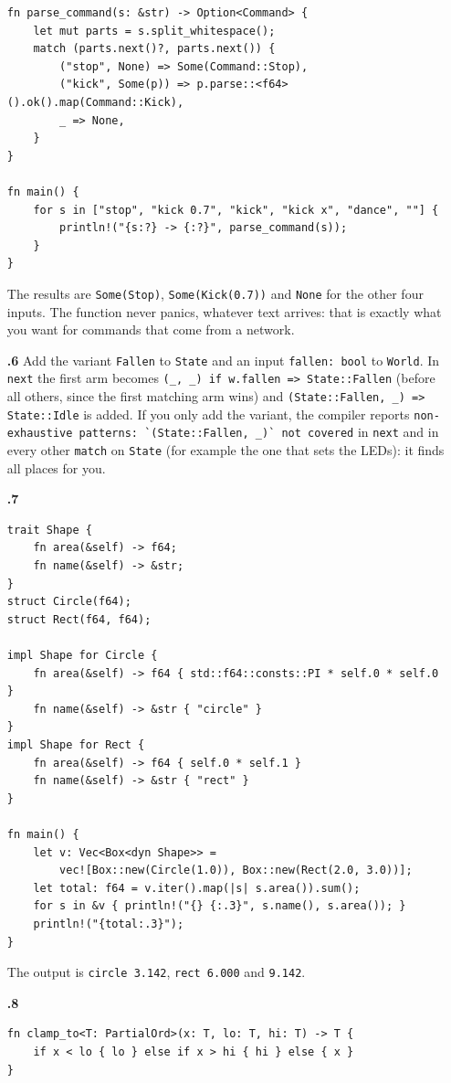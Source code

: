 \begin{enumerate}[label=\textbf{\ansnum.\arabic*}]
\begin{verbatim}
fn parse_command(s: &str) -> Option<Command> {
    let mut parts = s.split_whitespace();
    match (parts.next()?, parts.next()) {
        ("stop", None) => Some(Command::Stop),
        ("kick", Some(p)) => p.parse::<f64>().ok().map(Command::Kick),
        _ => None,
    }
}

fn main() {
    for s in ["stop", "kick 0.7", "kick", "kick x", "dance", ""] {
        println!("{s:?} -> {:?}", parse_command(s));
    }
}
\end{verbatim}
The results are \verb!Some(Stop)!, \verb!Some(Kick(0.7))! and \verb!None! for the other four inputs. The function never panics, whatever text arrives: that is exactly what you want for commands that come from a network.
  \item[\textbf{\ansnum.6}] Add the variant \verb!Fallen! to \verb!State! and an input \verb!fallen: bool! to \verb!World!. In \verb!next! the first arm becomes \verb!(_, _) if w.fallen => State::Fallen! (before all others, since the first matching arm wins) and \verb!(State::Fallen, _) => State::Idle! is added. If you only add the variant, the compiler reports \verb!non-exhaustive patterns: `(State::Fallen, _)` not covered! in \verb!next! and in every other \verb!match! on \verb!State! (for example the one that sets the LEDs): it finds all places for you.
  \item[\textbf{\ansnum.7}]
\begin{verbatim}
trait Shape {
    fn area(&self) -> f64;
    fn name(&self) -> &str;
}
struct Circle(f64);
struct Rect(f64, f64);

impl Shape for Circle {
    fn area(&self) -> f64 { std::f64::consts::PI * self.0 * self.0 }
    fn name(&self) -> &str { "circle" }
}
impl Shape for Rect {
    fn area(&self) -> f64 { self.0 * self.1 }
    fn name(&self) -> &str { "rect" }
}

fn main() {
    let v: Vec<Box<dyn Shape>> =
        vec![Box::new(Circle(1.0)), Box::new(Rect(2.0, 3.0))];
    let total: f64 = v.iter().map(|s| s.area()).sum();
    for s in &v { println!("{} {:.3}", s.name(), s.area()); }
    println!("{total:.3}");
}
\end{verbatim}
The output is \verb!circle 3.142!, \verb!rect 6.000! and \verb!9.142!.
  \item[\textbf{\ansnum.8}]
\begin{verbatim}
fn clamp_to<T: PartialOrd>(x: T, lo: T, hi: T) -> T {
    if x < lo { lo } else if x > hi { hi } else { x }
}


\end{verbatim}
\end{enumerate}
